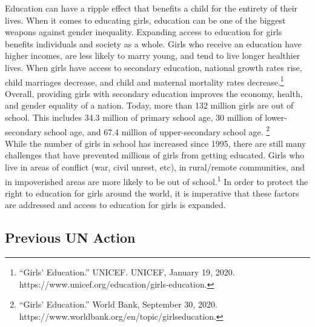\documentclass[10pt, letterpaper]{article}
\begin{document}
Education can have a ripple effect that benefits a child for the
entirety of their lives. When it comes to educating girls, education can
be one of the biggest weapons against gender inequality. Expanding
access to education for girls benefits individuals and society as a
whole. Girls who receive an education have higher incomes, are less
likely to marry young, and tend to live longer healthier lives. When
girls have access to secondary education, national growth rates rise,
child marriages decrease, and child and maternal mortality rates
decrease.\footnote{``Girls' Education.'' UNICEF. UNICEF, January 19,
  2020. https://www.unicef.org/education/girls-education.} Overall,
providing girls with secondary education improves the economy, health,
and gender equality of a nation. Today, more than 132 million girls are
out of school. This includes 34.3 million of primary school age, 30
million of lower-secondary school age, and 67.4 million of
upper-secondary school age. \footnote{``Girls' Education.'' World Bank,
  September 30, 2020. https://www.worldbank.org/en/topic/girlseducation.} \\

While the number of girls in school has increased since 1995, there are
still many challenges that have prevented millions of girls from getting
educated. Girls who live in areas of conflict (war, civil unrest, etc),
in rural/remote communities, and in impoverished areas are more likely
to be out of school.\textsuperscript{1} In order to protect the right to
education for girls around the world, it is imperative that these
factors are addressed and access to education for girls is expanded. \\

\subsection{Previous UN Action}
\end{document}
